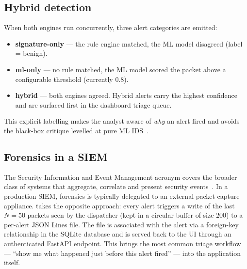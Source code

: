 \subsection{Hybrid detection}

When both engines run concurrently, three alert categories are emitted:
\begin{itemize}
    \item \textbf{signature-only} --- the rule engine matched, the ML
        model disagreed (label = benign).
    \item \textbf{ml-only} --- no rule matched, the ML model scored the
        packet above a configurable threshold (currently $0.8$).
    \item \textbf{hybrid} --- both engines agreed. Hybrid alerts carry
        the highest confidence and are surfaced first in the dashboard
        triage queue.
\end{itemize}
This explicit labelling makes the analyst aware of \textit{why} an alert
fired and avoids the black-box critique levelled at pure ML
IDS~\cite{sommer2010outside}.

\subsection{Forensics in a SIEM}

The Security Information and Event Management acronym covers the broader
class of systems that aggregate, correlate and present security
events~\cite{aguilar2017siem}. In a production SIEM, forensics is
typically delegated to an external packet capture appliance. \nidsname{}
takes the opposite approach: every alert triggers a write of the last
$N = 50$ packets seen by the dispatcher (kept in a circular buffer of
size $200$) to a per-alert JSON Lines file. The file is associated with
the alert via a foreign-key relationship in the SQLite database and is
served back to the UI through an authenticated FastAPI endpoint. This
brings the most common triage workflow --- ``show me what happened just
before this alert fired'' --- into the application itself.
